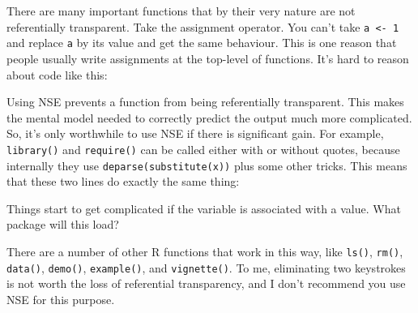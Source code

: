There are many important functions that by their very nature are not
referentially transparent. Take the assignment operator. You can't take
\texttt{a \textless{}- 1} and replace \texttt{a} by its value and get
the same behaviour. This is one reason that people usually write
assignments at the top-level of functions. It's hard to reason about
code like this:

\begin{Shaded}
\begin{Highlighting}[]
\StringTok{ }
\StringTok{ }
\StringTok{ }\StringTok{ }\NormalTok{) >}\StringTok{ }\StringTok{ }\StringTok{ }\NormalTok{)) \{}
  \StringTok{ }\StringTok{ }
\NormalTok{\}}
\end{Highlighting}
\end{Shaded}

Using NSE prevents a function from being referentially transparent. This
makes the mental model needed to correctly predict the output much more
complicated. So, it's only worthwhile to use NSE if there is significant
gain. For example, \texttt{library()} and \texttt{require()} can be
called either with or without quotes, because internally they use
\texttt{deparse(substitute(x))} plus some other tricks. This means that
these two lines do exactly the same thing:

\begin{Shaded}
\begin{Highlighting}[]
\NormalTok{(}\NormalTok{)}
\end{Highlighting}
\end{Shaded}

Things start to get complicated if the variable is associated with a
value. What package will this load?

\begin{Shaded}
\begin{Highlighting}[]
\end{Highlighting}
\end{Shaded}

There are a number of other R functions that work in this way, like
\texttt{ls()}, \texttt{rm()}, \texttt{data()}, \texttt{demo()},
\texttt{example()}, and \texttt{vignette()}. To me, eliminating two
keystrokes is not worth the loss of referential transparency, and I
don't recommend you use NSE for this purpose.

